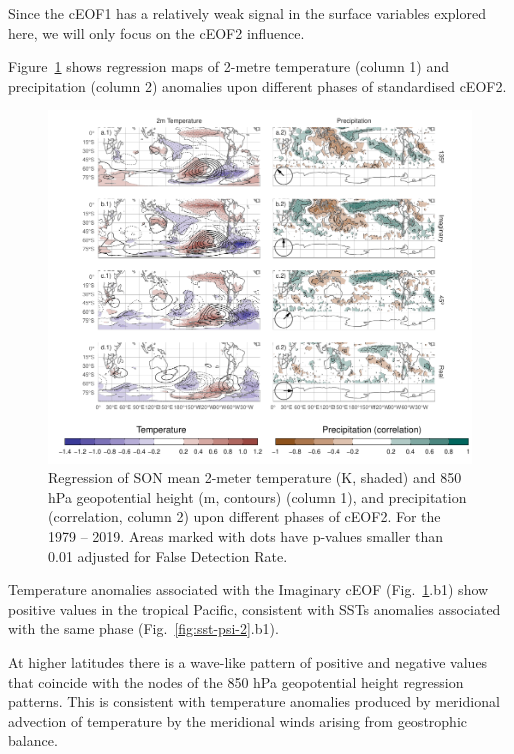 \documentclass[smallextended]{svjour3}       %
\begin{document}
Since the cEOF1 has a relatively weak signal in the surface variables explored here, we will only focus on the cEOF2 influence.

Figure~\ref{fig:pp-temp-2} shows regression maps of 2-metre temperature (column 1) and precipitation (column 2) anomalies upon different phases of standardised cEOF2.



\begin{figure}
\centering
\includegraphics{../figures/pp-temp-2-1.pdf}
\caption{\label{fig:pp-temp-2}Regression of SON mean 2-meter temperature (K, shaded) and 850 hPa geopotential height (m, contours) (column 1), and precipitation (correlation, column 2) upon different phases of cEOF2. For the 1979 -- 2019. Areas marked with dots have p-values smaller than 0.01 adjusted for False Detection Rate.}
\end{figure}

Temperature anomalies associated with the Imaginary cEOF (Fig.~\ref{fig:pp-temp-2}.b1) show positive values in the tropical Pacific, consistent with SSTs anomalies associated with the same phase (Fig.~\ref{fig:sst-psi-2}.b1).

At higher latitudes there is a wave-like pattern of positive and negative values that coincide with the nodes of the 850 hPa geopotential height regression patterns.
This is consistent with temperature anomalies produced by meridional advection of temperature by the meridional winds arising from geostrophic balance.
\end{document}
